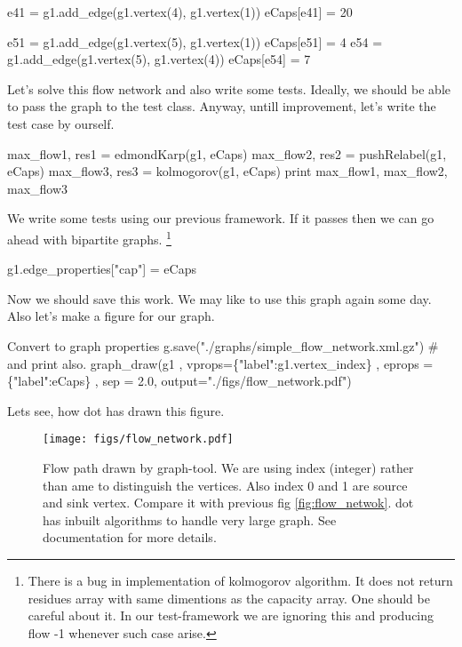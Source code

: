 \documentclass[10pt,a4paper]{article}%
\begin{document}
e41 = g1.add_edge(g1.vertex(4), g1.vertex(1))
eCaps[e41] = 20

e51 = g1.add_edge(g1.vertex(5), g1.vertex(1))
eCaps[e51] = 4
e54 = g1.add_edge(g1.vertex(5), g1.vertex(4))
eCaps[e54] = 7


\nwendcode{}Let's solve this flow network and also write some tests. Ideally, we should
be able to pass the graph to the test class. Anyway, untill improvement, let's
write the test case by ourself.

\nwenddocs{}\plusendmoddef\nwstartdeflinemarkup\nwenddeflinemarkup
max_flow1, res1 = edmondKarp(g1, eCaps)
max_flow2, res2 = pushRelabel(g1, eCaps)
max_flow3, res3 = kolmogorov(g1, eCaps)
print max_flow1, max_flow2, max_flow3

\nwendcode{} We write some tests using our previous framework. If it passes then we can go
ahead with bipartite graphs. \footnote{There is a bug in implementation of
{\Tt{}kolmogorov\nwendquote} algorithm. It does not return {\Tt{}residues\nwendquote} array with same
dimentions as the {\Tt{}capacity\nwendquote} array. One should be careful about it. In our
test-framework we are ignoring this and producing flow {\Tt{}-1\nwendquote} whenever such case
arise.}

\nwenddocs{}\plusendmoddef\nwstartdeflinemarkup\nwenddeflinemarkup
g1.edge_properties["cap"] = eCaps 

\nwendcode{}Now we should save this work. We may like to use this graph again some day.
Also let's make a figure for our graph.

\nwenddocs{}\plusendmoddef\nwstartdeflinemarkup\nwenddeflinemarkup
\LA{}Convert to graph properties\RA{}
g.save("./graphs/simple_flow_network.xml.gz")
# and print also.
graph_draw(g1
    , vprops=\{"label":g1.vertex_index\}
    , eprops = \{"label":eCaps\}
    , sep = 2.0, output="./figs/flow_network.pdf")

\nwendcode{}Lets see, how {\Tt{}dot\nwendquote} has drawn this figure.

\begin{figure}[h]
\centering
\texttt{[image: figs/flow\_network.pdf]}
\caption{Flow path drawn by graph-tool. We are using index (integer) rather than
ame to distinguish the vertices. Also index 0 and 1 are source and sink vertex.
Compare it with previous fig \ref{fig:flow_netwok}. {\Tt{}dot\nwendquote} has inbuilt algorithms
to handle very large graph. See documentation for more details.}
\end{figure}
\end{document}
